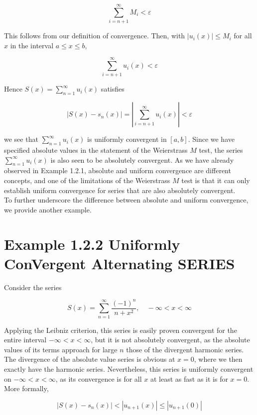 \documentclass[10pt]{article}
\begin{document}
$$
\sum_{i=n+1}^{\infty} M_{i}<\varepsilon
$$

This follows from our definition of convergence. Then, with $\left|u_{i}(x)\right| \leq M_{i}$ for all $x$ in the interval $a \leq x \leq b$,

$$
\sum_{i=n+1}^{\infty} u_{i}(x)<\varepsilon
$$

Hence $S(x)=\sum_{n=1}^{\infty} u_{i}(x)$ satisfies


\begin{equation*}
\left|S(x)-s_{n}(x)\right|=\left|\sum_{i=n+1}^{\infty} u_{i}(x)\right|<\varepsilon \tag{1.36}
\end{equation*}


we see that $\sum_{n=1}^{\infty} u_{i}(x)$ is uniformly convergent in $[a, b]$. Since we have specified absolute values in the statement of the Weierstrass $M$ test, the series $\sum_{n=1}^{\infty} u_{i}(x)$ is also seen to be absolutely convergent. As we have already observed in Example 1.2.1, absolute and uniform convergence are different concepts, and one of the limitations of the Weierstrass $M$ test is that it can only establish uniform convergence for series that are also absolutely convergent.\\
To further underscore the difference between absolute and uniform convergence, we provide another example.

\section*{Example 1.2.2 Uniformly ConVergent Alternating SERIES}
Consider the series


\begin{equation*}
S(x)=\sum_{n=1}^{\infty} \frac{(-1)^{n}}{n+x^{2}}, \quad-\infty<x<\infty \tag{1.37}
\end{equation*}


Applying the Leibniz criterion, this series is easily proven convergent for the entire interval $-\infty<x<\infty$, but it is not absolutely convergent, as the absolute values of its terms approach for large $n$ those of the divergent harmonic series. The divergence of the absolute value series is obvious at $x=0$, where we then exactly have the harmonic series. Nevertheless, this series is uniformly convergent on $-\infty<x<\infty$, as its convergence is for all $x$ at least as fast as it is for $x=0$. More formally,

$$
\left|S(x)-s_{n}(x)\right|<\left|u_{n+1}(x)\right| \leq\left|u_{n+1}(0)\right|
$$
\end{document}
